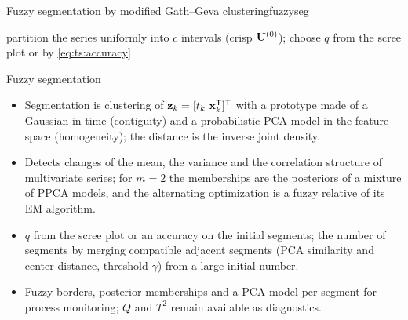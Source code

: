 \begin{algobox}{Fuzzy segmentation by modified Gath--Geva clustering}{fuzzyseg}
\begin{algorithm}[H]
partition the series uniformly into $c$ intervals (crisp $\mathbf{U}^{(0)}$); choose $q$ from the scree plot or by \eqref{eq:ts:accuracy}\;
\end{algorithm}
\end{algobox}
\begin{summarybox}{Fuzzy segmentation}
\begin{itemize}
  \item Segmentation is clustering of $\mathbf{z}_k=[t_k\ \mathbf{x}_k^{\mathsf{T}}]^{\mathsf{T}}$ with a prototype made of a Gaussian in time (contiguity) and a probabilistic PCA model in the feature space (homogeneity); the distance is the inverse joint density.
  \item Detects changes of the mean, the variance and the correlation structure of multivariate series; for $m=2$ the memberships are the posteriors of a mixture of PPCA models, and the alternating optimization is a fuzzy relative of its EM algorithm.
  \item $q$ from the scree plot or an accuracy on the initial segments; the number of segments by merging compatible adjacent segments (PCA similarity and center distance, threshold $\gamma$) from a large initial number.
  \item Fuzzy borders, posterior memberships and a PCA model per segment for process monitoring; $Q$ and $T^2$ remain available as diagnostics.
\end{itemize}
\end{summarybox}

